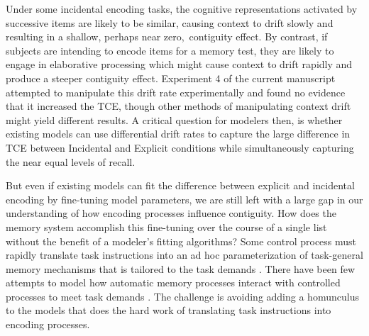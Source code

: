 \documentclass[man,natbib,floatsintext]{apa6} %
\begin{document}
Under some incidental encoding tasks, the cognitive representations activated by successive items are likely to be similar, causing context to drift slowly and resulting in a shallow\color{red}, perhaps near zero,\color{black}~contiguity effect. By contrast, if subjects are intending to encode items for a memory test, they are likely to engage in elaborative processing which might cause context to drift rapidly and produce a steeper contiguity effect. Experiment 4 of the current manuscript attempted to manipulate this drift rate experimentally and found no evidence that it increased the TCE, though other methods of manipulating context drift \citep[e.g.,][]{PolyEtal12} might yield different results. A critical question for modelers then, is whether existing models can use differential drift rates to capture the large difference in TCE between Incidental and Explicit conditions while simultaneously capturing the near equal levels of recall.

But even if existing models can fit the difference between explicit and incidental encoding by fine-tuning model parameters, we are still left with a large gap in our understanding of how encoding processes influence contiguity. How does the memory system accomplish this fine-tuning over the course of a single list without the benefit of a modeler's fitting algorithms? Some control process must rapidly translate task instructions into an ad hoc parameterization of task-general memory mechanisms that is tailored to the task demands \citep{HealEtal14,AtkiShif68}. There have been few attempts to model how automatic memory processes interact with controlled processes to meet task demands \citep{LehmMalm13,PolyEtal09}. The challenge is avoiding adding a homunculus to the models that does the hard work of translating task instructions into encoding processes.
\end{document}
